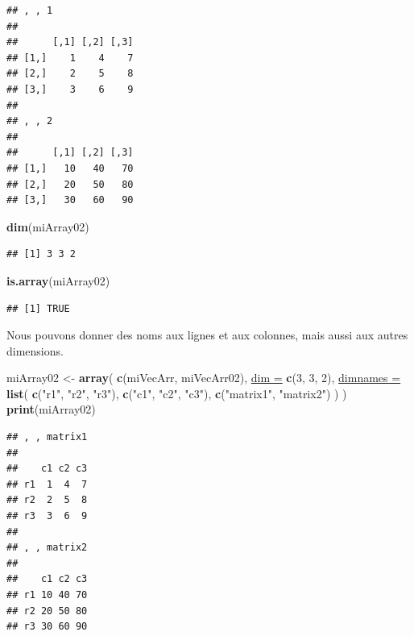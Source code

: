 \documentclass[twoside,symmetric]{book}
\newenvironment{Shaded}{}{}
\newcommand{\DataTypeTok}[1]{\underline{#1}}
\newcommand{\DecValTok}[1]{#1}
\newcommand{\KeywordTok}[1]{\textbf{#1}}
\newcommand{\NormalTok}[1]{#1}
\newcommand{\StringTok}[1]{#1}
\begin{document}
\begin{verbatim}
## , , 1
## 
##      [,1] [,2] [,3]
## [1,]    1    4    7
## [2,]    2    5    8
## [3,]    3    6    9
## 
## , , 2
## 
##      [,1] [,2] [,3]
## [1,]   10   40   70
## [2,]   20   50   80
## [3,]   30   60   90
\end{verbatim}

\begin{Shaded}
\begin{Highlighting}[]
\KeywordTok{dim}\NormalTok{(miArray02)}
\end{Highlighting}
\end{Shaded}

\begin{verbatim}
## [1] 3 3 2
\end{verbatim}

\begin{Shaded}
\begin{Highlighting}[]
\KeywordTok{is.array}\NormalTok{(miArray02)}
\end{Highlighting}
\end{Shaded}

\begin{verbatim}
## [1] TRUE
\end{verbatim}

Nous pouvons donner des noms aux lignes et aux colonnes, mais aussi aux autres dimensions.

\begin{Shaded}
\begin{Highlighting}[]
\NormalTok{miArray02 <-}\StringTok{ }\KeywordTok{array}\NormalTok{(}
  \KeywordTok{c}\NormalTok{(miVecArr, miVecArr02), }
  \DataTypeTok{dim =} \KeywordTok{c}\NormalTok{(}\DecValTok{3}\NormalTok{, }\DecValTok{3}\NormalTok{, }\DecValTok{2}\NormalTok{), }
  \DataTypeTok{dimnames =} \KeywordTok{list}\NormalTok{(}
    \KeywordTok{c}\NormalTok{(}\StringTok{"r1"}\NormalTok{, }\StringTok{"r2"}\NormalTok{, }\StringTok{"r3"}\NormalTok{), }
    \KeywordTok{c}\NormalTok{(}\StringTok{"c1"}\NormalTok{, }\StringTok{"c2"}\NormalTok{, }\StringTok{"c3"}\NormalTok{), }
    \KeywordTok{c}\NormalTok{(}\StringTok{"matrix1"}\NormalTok{, }\StringTok{"matrix2"}\NormalTok{)}
\NormalTok{  )}
\NormalTok{)}
\KeywordTok{print}\NormalTok{(miArray02)}
\end{Highlighting}
\end{Shaded}

\begin{verbatim}
## , , matrix1
## 
##    c1 c2 c3
## r1  1  4  7
## r2  2  5  8
## r3  3  6  9
## 
## , , matrix2
## 
##    c1 c2 c3
## r1 10 40 70
## r2 20 50 80
## r3 30 60 90
\end{verbatim}
\end{document}
